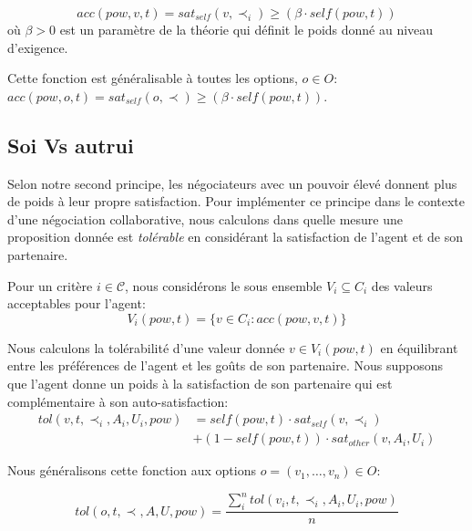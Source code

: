 		\begin{equation}
		acc(pow,v, t) = sat_{self}(v, \prec_i) \geq  (\beta \cdot self(pow,t))
		\end{equation}	
		où $ \beta> 0 $ est un paramètre de la théorie qui définit le poids donné au niveau d'exigence.
		
		Cette fonction est généralisable à toutes les options,  $o \in O$: $acc(pow,o, t) = sat_{self}(o, \prec) \geq  (\beta \cdot self(pow,t))$.
		
		\subsection{Soi Vs autrui}
	
		Selon notre second principe, les négociateurs avec un pouvoir élevé donnent plus de poids à leur propre satisfaction. Pour implémenter ce principe dans le contexte d'une négociation collaborative, nous calculons dans quelle mesure une proposition donnée est \textit{tolérable} en considérant la satisfaction de l'agent et de son partenaire.
		
		Pour un critère $i \in \mathcal{C}$, nous considérons le sous ensemble $V_i\subseteq C_i$ des valeurs acceptables pour l'agent: 
			\begin{equation}
			V_i(pow,t) = \{ v\in C_i : acc(pow,v,t) \}
			\end{equation}
		
		
		Nous calculons la tolérabilité d'une valeur donnée $ v \in V_i (pow, t) $ en équilibrant entre les préférences de l'agent et les goûts de son partenaire. Nous supposons que l'agent donne un poids à la satisfaction de son partenaire qui est complémentaire à son auto-satisfaction:
			\begin{equation}
			\begin{split}
			tol(v, t, \prec_i, A_i, U_i, pow) & = self(pow, t)  \cdot sat_{self}(v, \prec_i) \\
			& +  (1 - self(pow, t)) \cdot sat_{other}(v, A_i, U_i)
			\end{split} 
			\end{equation}
		
		
		Nous généralisons cette fonction aux options $o=(v_1,\ldots,v_n) \in O$:
		
		\begin{equation}
		tol(o, t, \prec, A, U, pow) = \frac{ \sum_{i}^{n} tol(v_i, t, \prec_i, A_i, U_i, pow) } {n}
		\end{equation}
		
